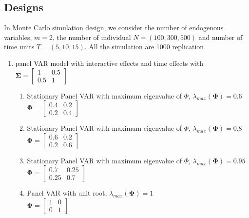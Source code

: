 \documentclass[12pt,a4paper,hyperref]{article}
\begin{document}
\subsection{Designs}
In Monte Carlo simulation design, we consider the number of endogenous variables, $m=2$, the number of individual $N=\left(100, 300, 500 \right)$ and number of time units $T=\left(5, 10, 15 \right)$. All the simulation are 1000 replication.
\begin{enumerate}

\item panel VAR model with interactive effects and time effects with
$\boldsymbol{\Sigma}=
\begin{bmatrix}
1 & 0.5 \\
0.5 & 1
\end{bmatrix}$

\begin{enumerate}
\item  Stationary Panel VAR with maximum eigenvalue of $\Phi$, $\lambda_{max}(\boldsymbol{\Phi})=0.6$ \\

$\boldsymbol{\Phi}=
\begin{bmatrix}
0.4 & 0.2 \\
0.2 & 0.4
\end{bmatrix}$



\item  Stationary Panel VAR with maximum eigenvalue of $\Phi$, $\lambda_{max}(\boldsymbol{\Phi})=0.8$ \\

$\boldsymbol{\Phi}=
\begin{bmatrix}
0.6 & 0.2 \\
0.2 & 0.6
\end{bmatrix}$
\\



\item  Stationary Panel VAR with maximum eigenvalue of $\Phi$, $\lambda_{max}(\boldsymbol{\Phi})=0.95$ \\
$\boldsymbol{\Phi}=
\begin{bmatrix}
0.7 & 0.25 \\
0.25 & 0.7
\end{bmatrix}$
\\


\item   Panel VAR with unit root, $\lambda_{max}(\boldsymbol{\Phi})=1$
\\
$\boldsymbol{\Phi}=
\begin{bmatrix}
1 & 0 \\
0 & 1
\end{bmatrix}$

\end{enumerate}
\end{enumerate}
\end{document}
